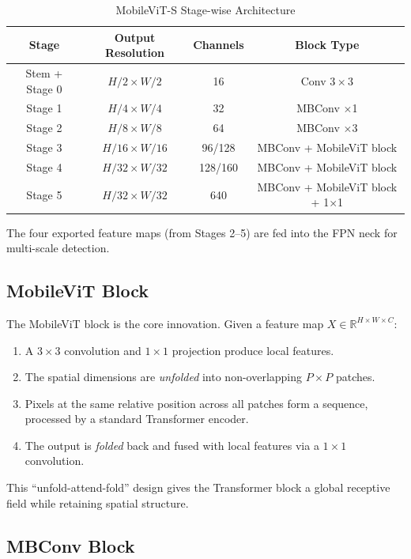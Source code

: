\begin{table}[h!]
\centering
\caption{MobileViT-S Stage-wise Architecture}
\begin{tabular}{|c|c|c|c|}
\hline
\textbf{Stage} & \textbf{Output Resolution} & \textbf{Channels} & \textbf{Block Type} \\
\hline
Stem + Stage 0 & $H/2 \times W/2$ & 16 & Conv $3\times3$ \\
Stage 1        & $H/4 \times W/4$ & 32 & MBConv $\times$1 \\
Stage 2        & $H/8 \times W/8$ & 64 & MBConv $\times$3 \\
Stage 3        & $H/16 \times W/16$ & 96/128 & MBConv + MobileViT block \\
Stage 4        & $H/32 \times W/32$ & 128/160 & MBConv + MobileViT block \\
Stage 5        & $H/32 \times W/32$ & 640 & MBConv + MobileViT block + 1$\times$1 \\
\hline
\end{tabular}
\label{table:mobilevit_stages}
\end{table}

The four exported feature maps (from Stages 2--5) are fed into the FPN neck for multi-scale detection.

\subsection{MobileViT Block}

The MobileViT block is the core innovation. Given a feature map $X \in \mathbb{R}^{H \times W \times C}$:
\begin{enumerate}
    \item A $3\times3$ convolution and $1\times1$ projection produce local features.
    \item The spatial dimensions are \textit{unfolded} into non-overlapping $P \times P$ patches.
    \item Pixels at the same relative position across all patches form a sequence, processed by a standard Transformer encoder.
    \item The output is \textit{folded} back and fused with local features via a $1\times1$ convolution.
\end{enumerate}

This ``unfold-attend-fold'' design gives the Transformer block a global receptive field while retaining spatial structure.

\subsection{MBConv Block}

